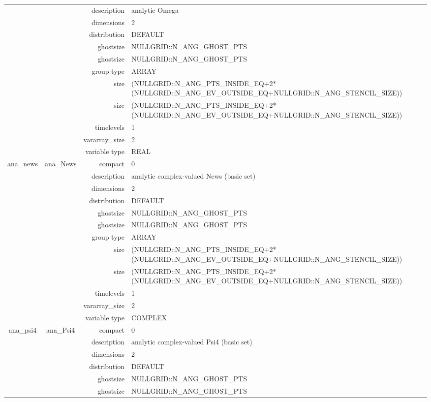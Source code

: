 \begin{tabular*}{150mm}{|c|c@{\extracolsep{\fill}}|rl|}
 &  & description & analytic Omega \\ 
 &  & dimensions & 2 \\ 
 &  & distribution & DEFAULT \\ 
 &  & ghostsize & NULLGRID::N\_ANG\_GHOST\_PTS \\ 
& ~ & ghostsize & NULLGRID::N\_ANG\_GHOST\_PTS \\ 
 &  & group type & ARRAY \\ 
 &  & size & (NULLGRID::N\_ANG\_PTS\_INSIDE\_EQ+2*(NULLGRID::N\_ANG\_EV\_OUTSIDE\_EQ+NULLGRID::N\_ANG\_STENCIL\_SIZE)) \\ 
& ~ & size & (NULLGRID::N\_ANG\_PTS\_INSIDE\_EQ+2*(NULLGRID::N\_ANG\_EV\_OUTSIDE\_EQ+NULLGRID::N\_ANG\_STENCIL\_SIZE)) \\ 
 &  & timelevels & 1 \\ 
 &  & vararray\_size & 2 \\ 
 &  & variable type & REAL \\ 
\hline 
ana\_news & ana\_News & compact & 0 \\ 
 &  & description & analytic complex-valued News (basic set) \\ 
 &  & dimensions & 2 \\ 
 &  & distribution & DEFAULT \\ 
 &  & ghostsize & NULLGRID::N\_ANG\_GHOST\_PTS \\ 
& ~ & ghostsize & NULLGRID::N\_ANG\_GHOST\_PTS \\ 
 &  & group type & ARRAY \\ 
 &  & size & (NULLGRID::N\_ANG\_PTS\_INSIDE\_EQ+2*(NULLGRID::N\_ANG\_EV\_OUTSIDE\_EQ+NULLGRID::N\_ANG\_STENCIL\_SIZE)) \\ 
& ~ & size & (NULLGRID::N\_ANG\_PTS\_INSIDE\_EQ+2*(NULLGRID::N\_ANG\_EV\_OUTSIDE\_EQ+NULLGRID::N\_ANG\_STENCIL\_SIZE)) \\ 
 &  & timelevels & 1 \\ 
 &  & vararray\_size & 2 \\ 
 &  & variable type & COMPLEX \\ 
\hline 
ana\_psi4 & ana\_Psi4 & compact & 0 \\ 
 &  & description & analytic complex-valued Psi4 (basic set) \\ 
 &  & dimensions & 2 \\ 
 &  & distribution & DEFAULT \\ 
 &  & ghostsize & NULLGRID::N\_ANG\_GHOST\_PTS \\ 
& ~ & ghostsize & NULLGRID::N\_ANG\_GHOST\_PTS \\ 

\end{tabular*}
